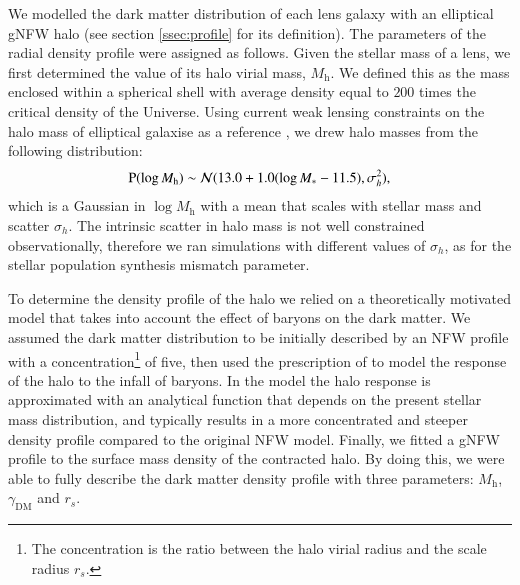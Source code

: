\documentclass{aa}
\def\mstar{M_*}
\def\gammadm{\gamma_{\mathrm{DM}}}
\def\mhalo{M_{\mathrm{h}}}
\def\pr{{\rm P}}
\begin{document}
We modelled the dark matter distribution of each lens galaxy with an elliptical gNFW halo (see section \ref{ssec:profile} for its definition).
The parameters of the radial density profile were assigned as follows.
Given the stellar mass of a lens, we first determined the value of its halo virial mass, $\mhalo$. We defined this as the mass enclosed within a spherical shell with average density equal to $200$ times the critical density of the Universe.
Using current weak lensing constraints on the halo mass of elliptical galaxise as a reference \citep{Son++22}, we drew halo masses from the following distribution:
\begin{equation}
\pr(\log{\mhalo}) \sim \mathcal{N}(13.0 + 1.0(\log{\mstar} - 11.5), \sigma_h^2),
\end{equation}
which is a Gaussian in $\log{\mhalo}$ with a mean that scales with stellar mass and scatter $\sigma_h$.
The intrinsic scatter in halo mass is not well constrained observationally, therefore we ran simulations with different values of $\sigma_h$, as for the stellar population synthesis mismatch parameter.

To determine the density profile of the halo we relied on a theoretically motivated model that takes into account the effect of baryons on the dark matter.
We assumed the dark matter distribution to be initially described by an NFW profile with a concentration\footnote{The concentration is the ratio between the halo virial radius and the scale radius $r_s$.} of five, then used the prescription of \citet{Cau++20} to model the response of the halo to the infall of baryons. %
In the \citet{Cau++20} model the halo response is approximated with an analytical function that depends on the present stellar mass distribution, and typically results in a more concentrated and steeper density profile compared to the original NFW model. 
Finally, we fitted a gNFW profile to the surface mass density of the contracted halo. By doing this, we were able to fully describe the dark matter density profile with three parameters: $\mhalo$, $\gammadm$ and $r_s$.
\end{document}
